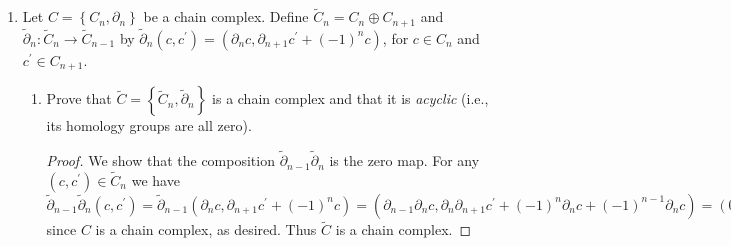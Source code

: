 \documentclass[11pt]{article}
\newcommand{\cbr}[1]{\left\{#1\right\}}
\newcommand{\catname}[1]{{\textbf{#1} }}
\newcommand{\Top}{\catname{Top}}
\begin{document}
\begin{enumerate}
\begin{enumerate}
\begin{proof}
            Naturally the identity chain map on a chain complex $C_\ast$ induces the identity map on its homology groups since the action on each $C_n$, and hence on all subgroups of $C_n$, is the identity. If $f\colon C_\ast\to D_\ast$ and $g\colon D_\ast\to E_\ast$ are chain maps, their composition induces a map $(gf)_\ast\to H_n^C\to H_n^E$ on homology which by construction will act by sending an element $[a]$ to $[gfa] = g(f[a])$, which is the action of the composition $g_\ast f_\ast$.

            It follows homology is a functor.
        \end{proof}
        \item Show that the composition of two functors is a functor. It follows that $H_\ast\coloneqq H\circ C_\ast$ is a functor $H_\ast\colon \Top\to \catname{grAb}$. \begin{proof}
            Given functors $F\colon \mathcal{C}\to \mathcal{D}$ and $G\colon \mathcal{D}\to \mathcal{E}$, it is clear their composition sends objects to objects and morphisms to morphisms. Since $F,G$ take identity morphisms to identity morphisms, $GF$ takes identity morphisms to identity morphisms. Given morphisms $f\colon X\to Y$, $g\colon Y\to Z$ in $\mathcal{C}$, $F$ preserves composition, and then $G$ will also on $F(gf) = Fg\circ Ff\colon FX\to FY$ so that $G(Fg\circ Ff) = GFg\circ GFf = GF(gf)\colon GFX\to GFY$ as desired. Hence the composition of functors is a functor.

            As a corollary, it follows the composition of functors $H_\ast\coloneqq H\circ C_\ast$ is a functor.
        \end{proof}
    \end{enumerate}
    \item Let $C = \cbr{C_n,\partial_n}$ be a chain complex. Define $\tilde{C}_n = C_n\oplus C_{n+1}$ and $\tilde{\partial}_n\colon \tilde{C}_n\to \tilde{C}_{n-1}$ by $\tilde{\partial}_n(c,c^\prime) = (\partial_n c, \partial_{n+1}c^\prime + (-1)^n c)$, for $c\in C_n$ and $c^\prime\in C_{n+1}$. \begin{enumerate}
        \item Prove that $\tilde{C} = \cbr{\tilde{C}_n,\tilde{\partial}_n}$ is a chain complex and that it is \textit{acyclic} (i.e., its homology groups are all zero). \begin{proof}
            We show that the composition $\tilde{\partial}_{n-1}\tilde{\partial}_n$ is the zero map. For any $(c,c^\prime)\in \tilde{C}_n$ we have $\tilde{\partial}_{n-1}\tilde{\partial}_n(c,c^\prime) = \tilde{\partial}_{n-1}(\partial_n c, \partial_{n+1}c^\prime + (-1)^n c) = (\partial_{n-1}\partial_n c, \partial_n\partial_{n+1}c^\prime + (-1)^n \partial_n c + (-1)^{n-1}\partial_n c) = (0,0+0) = 0$ since $C$ is a chain complex, as desired. Thus $\tilde{C}$ is a chain complex.


\end{proof}
\end{enumerate}
\end{enumerate}
\end{document}
